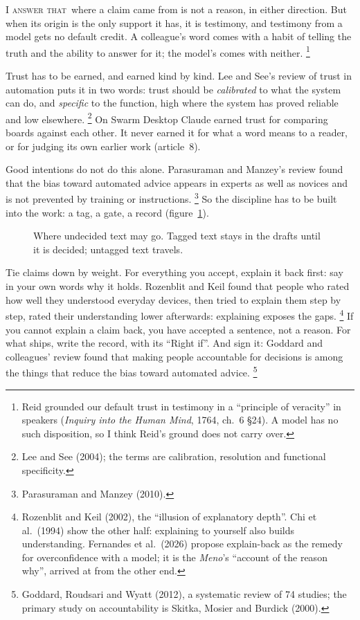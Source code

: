\documentclass[11pt,a4paper]{article}
\newcounter{art}
\newcommand{\Respondeo}{\par\vspace{1.5mm}\noindent\textsc{I answer that}\ }
\newcommand{\Fig}[3]{%
  \begin{figure}[tbp]\centering #1 \caption{#2}\label{#3}\end{figure}}
\begin{document}
\Respondeo where a claim came from is not a reason, in either direction. But when its origin is the only support it has, it is testimony, and testimony from a model gets no default credit. A colleague's word comes with a habit of telling the truth and the ability to answer for it; the model's comes with neither.%
\footnote{Reid grounded our default trust in testimony in a ``principle of veracity'' in speakers (\textit{Inquiry into the Human Mind}, 1764, ch.~6 §24). A model has no such disposition, so I think Reid's ground does not carry over.}

Trust has to be earned, and earned kind by kind. Lee and See's review of trust in automation puts it in two words: trust should be \emph{calibrated} to what the system can do, and \emph{specific} to the function, high where the system has proved reliable and low elsewhere.%
\footnote{Lee and See (2004); the terms are calibration, resolution and functional specificity.}
On Swarm Desktop Claude earned trust for comparing boards against each other. It never earned it for what a word means to a reader, or for judging its own earlier work (article~8).

Good intentions do not do this alone. Parasuraman and Manzey's review found that the bias toward automated advice appears in experts as well as novices and is not prevented by training or instructions.%
\footnote{Parasuraman and Manzey (2010).}
So the discipline has to be built into the work: a tag, a gate, a record (figure~\ref{fig:textpath}).

\Fig{\FigTextPath}{Where undecided text may go. Tagged text stays in the drafts until it is decided; untagged text travels.}{fig:textpath}

Tie claims down by weight. For everything you accept, explain it back first: say in your own words why it holds. Rozenblit and Keil found that people who rated how well they understood everyday devices, then tried to explain them step by step, rated their understanding lower afterwards: explaining exposes the gaps.%
\footnote{Rozenblit and Keil (2002), the ``illusion of explanatory depth''. Chi et al.\ (1994) show the other half: explaining to yourself also builds understanding. Fernandes et al.\ (2026) propose explain-back as the remedy for overconfidence with a model; it is the \textit{Meno}'s ``account of the reason why'', arrived at from the other end.}
If you cannot explain a claim back, you have accepted a sentence, not a reason. For what ships, write the record, with its ``Right if''. And sign it: Goddard and colleagues' review found that making people accountable for decisions is among the things that reduce the bias toward automated advice.%
\footnote{Goddard, Roudsari and Wyatt (2012), a systematic review of 74 studies; the primary study on accountability is Skitka, Mosier and Burdick (2000).}
\end{document}
